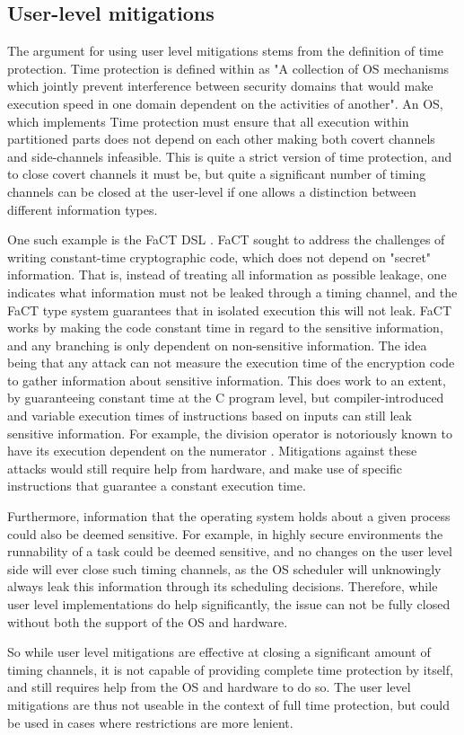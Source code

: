 \subsection{User-level mitigations}
The argument for using user level mitigations stems from the definition of time
protection. Time protection is defined within \cite{ge2019} as "A collection of
OS mechanisms which jointly prevent interference between security domains that
would make execution speed in one domain dependent on the activities of
another". An OS, which implements Time protection must ensure that all
execution within partitioned parts does not depend on each other making both
covert channels and side-channels infeasible. This is quite a strict version of
time protection, and to close covert channels it must be, but quite a
significant number of timing channels can be closed at the user-level if one
allows a distinction between different information types.

One such example is the FaCT DSL \cite{cauligi2019}. FaCT sought to address the
challenges of writing constant-time cryptographic code, which does not depend
on "secret" information. That is, instead of treating all information as
possible leakage, one indicates what information must not be leaked through a
timing channel, and the FaCT type system guarantees that in isolated execution
this will not leak. FaCT works by making the code constant time in regard to
the sensitive information, and any branching is only dependent on non-sensitive
information. The idea being that any attack can not measure the execution time
of the encryption code to gather information about sensitive information. This
does work to an extent, by guaranteeing constant time at the C program level,
but compiler-introduced and variable execution times of instructions based on
inputs can still leak sensitive information. For example, the division operator
is notoriously known to have its execution dependent on the numerator
\cite{schroder, jin2023}. Mitigations against these attacks would still require
help from hardware, and make use of specific instructions that guarantee a
constant execution time.

Furthermore, information that the operating system holds about a given process
could also be deemed sensitive. For example, in highly secure environments the
runnability of a task could be deemed sensitive, and no changes on the user
level side will ever close such timing channels, as the OS scheduler will
unknowingly always leak this information through its scheduling decisions.
Therefore, while user level implementations do help significantly, the issue
can not be fully closed without both the support of the OS and hardware.

So while user level mitigations are effective at closing a significant amount
of timing channels, it is not capable of providing complete time protection by
itself, and still requires help from the OS and hardware to do so. The user
level mitigations are thus not useable in the context of full time protection,
but could be used in cases where restrictions are more lenient.

